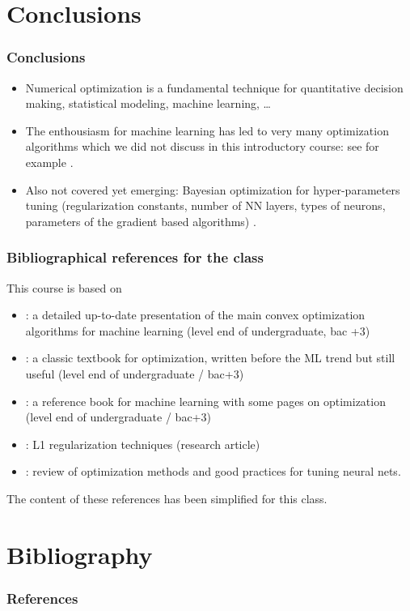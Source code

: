 \documentclass[12pt]{beamer}
\begin{document}
\section*{Conclusions}

\begin{frame}
\frametitle{Conclusions}
\begin{itemize}
\item Numerical optimization is a fundamental technique for quantitative decision making, statistical modeling, machine learning, \ldots
\item The enthousiasm for machine learning has led to very many optimization algorithms which we did not discuss in this introductory course: see for example \cite{sun2019survey,sra2012optimization}. 
\item Also not covered yet emerging: Bayesian optimization for hyper-parameters tuning (regularization constants, number of NN layers, types of neurons, parameters of the gradient based algorithms) \cite{snoek2012practical}.
\end{itemize}
\end{frame}

\begin{frame}
\frametitle{Bibliographical references for the class}
{\small
This course is based on
\begin{itemize}
\item \cite{ravikumar17} : a detailed up-to-date presentation of the main convex optimization algorithms for machine learning (level end of undergraduate, bac +3)
\item \cite{minoux2008programmation} : a classic textbook for optimization, written before the ML trend but still useful (level end of undergraduate / bac+3)
\item \cite{bishop2006pattern} : a reference book for machine learning with some pages on optimization (level end of undergraduate / bac+3)
\item \cite{schmidt2007fast} : L1 regularization techniques (research article)
\item \cite{sun2019optimization} : review of optimization methods and good practices for tuning neural nets.
\end{itemize}
The content of these references has been simplified for this class.
} %
\end{frame}

\section{Bibliography}

\begin{frame}[allowframebreaks]
\frametitle{References}
\scriptsize
%   
   
   
\end{frame}
\end{document}
